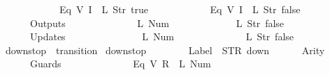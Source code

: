 \begin{isabellebody}
\ \ \ \ \ \ \ \ \ \ \ \ {\isacharparenleft}Eq\ {\isacharparenleft}V\ {\isacharparenleft}I\ {}{\isacharparenright}{\isacharparenright}\ {\isacharparenleft}L\ {\isacharparenleft}Str\ {\isacharprime}{\isacharprime}true{\isacharprime}{\isacharprime}{\isacharparenright}{\isacharparenright}{\isacharparenright}{\isacharcomma}\isanewline
\ \ \ \ \ \ \ \ \ \ \ \ {\isacharparenleft}Eq\ {\isacharparenleft}V\ {\isacharparenleft}I\ {}{\isacharparenright}{\isacharparenright}\ {\isacharparenleft}L\ {\isacharparenleft}Str\ {\isacharprime}{\isacharprime}false{\isacharprime}{\isacharprime}{\isacharparenright}{\isacharparenright}{\isacharparenright}\isanewline
\ \ \ \ \ \ {\isacharbrackright}{\isacharcomma}\isanewline
\ \ \ \ \ \ Outputs\ {\isacharequal}\ {\isacharbrackleft}\isanewline
\ \ \ \ \ \ \ \ \ \ \ \ {\isacharparenleft}L\ {\isacharparenleft}Num\ {}{\isacharparenright}{\isacharparenright}{\isacharcomma}\isanewline
\ \ \ \ \ \ \ \ \ \ \ \ {\isacharparenleft}L\ {\isacharparenleft}Str\ {\isacharprime}{\isacharprime}false{\isacharprime}{\isacharprime}{\isacharparenright}{\isacharparenright}\isanewline
\ \ \ \ \ \ {\isacharbrackright}{\isacharcomma}\isanewline
\ \ \ \ \ \ Updates\ {\isacharequal}\ {\isacharbrackleft}\isanewline
\ \ \ \ \ \ \ \ \ \ \ \ {\isacharparenleft}{}{\isacharcomma}\ {\isacharparenleft}L\ {\isacharparenleft}Num\ {}{\isacharparenright}{\isacharparenright}{\isacharparenright}{\isacharcomma}\isanewline
\ \ \ \ \ \ \ \ \ \ \ \ {\isacharparenleft}{}{\isacharcomma}\ {\isacharparenleft}L\ {\isacharparenleft}Str\ {\isacharprime}{\isacharprime}false{\isacharprime}{\isacharprime}{\isacharparenright}{\isacharparenright}{\isacharparenright}\isanewline
\ \ \ \ \ \ {\isacharbrackright}\isanewline
{\isasymrparr}{\isachardoublequoteclose}\isanewline
\isanewline
{}\isamarkupfalse%
\ {\isachardoublequoteopen}down{}{}stop{\isachardoublequoteclose}\ {\isacharcolon}{\isacharcolon}\ {\isachardoublequoteopen}transition{\isachardoublequoteclose}\ \isanewline
{\isachardoublequoteopen}down{}{}stop\ {\isasymequiv}\ {\isasymlparr}\isanewline
\ \ \ \ \ \ Label\ {\isacharequal}\ STR\ {\isacharprime}{\isacharprime}down{\isacharprime}{\isacharprime}{\isacharcomma}\isanewline
\ \ \ \ \ \ Arity\ {\isacharequal}\ {}{\isacharcomma}\isanewline
\ \ \ \ \ \ Guards\ {\isacharequal}\ {\isacharbrackleft}\isanewline
\ \ \ \ \ \ \ \ \ \ \ \ {\isacharparenleft}Eq\ {\isacharparenleft}V\ {\isacharparenleft}R\ {}{\isacharparenright}{\isacharparenright}\ {\isacharparenleft}L\ {\isacharparenleft}Num\ {}{\isacharparenright}{\isacharparenright}{\isacharparenright}{\isacharcomma}\isanewline

\end{isabellebody}
